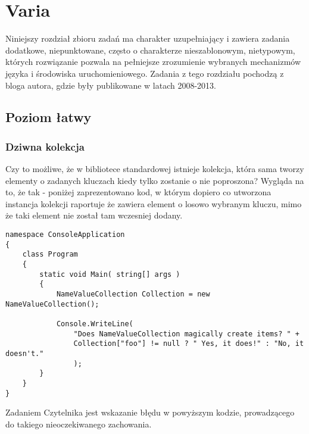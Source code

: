 ﻿\appendix 

\chapter{Varia}

Niniejszy rozdział zbioru zadań	ma charakter uzupełniający i zawiera zadania dodatkowe, niepunktowane, często o charakterze nieszablonowym, nietypowym, których rozwiązanie
pozwala na pełniejsze zrozumienie wybranych mechanizmów języka i środowiska uruchomieniowego. Zadania z tego rozdziału pochodzą z bloga autora, gdzie były publikowane w latach 2008-2013.

\section{Poziom łatwy}

\subsection{Dziwna kolekcja}

Czy to możliwe, że w bibliotece standardowej istnieje kolekcja, która sama tworzy elementy o zadanych kluczach kiedy tylko zostanie o nie poproszona?
Wygląda na to, że tak - poniżej zaprezentowano kod, w którym dopiero co utworzona instancja kolekcji raportuje że zawiera element o losowo wybranym kluczu, 
mimo że taki element nie został tam wczesniej dodany.

\begin{scriptsize}
\begin{verbatim}
namespace ConsoleApplication
{
    class Program
    {
        static void Main( string[] args )
        {
            NameValueCollection Collection = new NameValueCollection();
 
            Console.WriteLine( 
                "Does NameValueCollection magically create items? " +
                Collection["foo"] != null ? " Yes, it does!" : "No, it doesn't." 
                );
        }
    }
}
\end{verbatim}
\end{scriptsize}

Zadaniem Czytelnika jest wskazanie błędu w powyższym kodzie, prowadzącego do takiego nieoczekiwanego zachowania.

